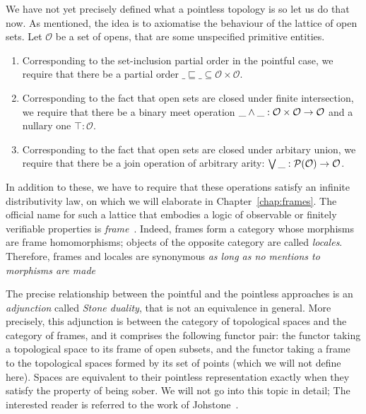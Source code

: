 We have not yet precisely defined what a pointless topology is so let us do that now. As
mentioned, the idea is to axiomatise the behaviour of the lattice of open sets. Let
$\mathcal{O}$ be a set of opens, that are some unspecified primitive entities.
\begin{enumerate}
  \item Corresponding to the set-inclusion partial order in the pointful case, we require
    that there be a partial order $\_\sqsubseteq\_ \subseteq \mathcal{O} \times \mathcal{O}$.
  \item Corresponding to the fact that open sets are closed under finite intersection, we
    require that there be a binary meet operation $\_ \wedge \_ : \mathcal{O} \times
    \mathcal{O} \rightarrow \mathcal{O}$ and a nullary one $\top : \mathcal{O}$.
  \item Corresponding to the fact that open sets are closed under arbitary union, we
    require that there be a join operation of arbitrary arity: $\bigvee{}\_ :
    \mathcal{P}(\mathcal{O}) \rightarrow \mathcal{O}$.
\end{enumerate}
In addition to these, we have to require that these operations satisfy an infinite
distributivity law, on which we will elaborate in Chapter~\ref{chap:frames}. The official
name for such a lattice that embodies a logic of observable or finitely verifiable
properties is \emph{frame}~\cite{vickers}. Indeed, frames form a category whose morphisms
are frame homomorphisms; objects of the opposite category are called \emph{locales}.
Therefore, frames and locales are synonymous
\emph{as long as no mentions to morphisms are made}~\cite{vickers, stone-spaces}

The precise relationship between the pointful and the pointless approaches is an
\emph{adjunction} called \emph{Stone duality}, that is not an equivalence in general. More
precisely, this adjunction is between the category of topological spaces and the category
of frames, and it comprises the following functor pair: the functor taking a topological
space to its frame of open subsets, and the functor taking a frame to the topological
spaces formed by its set of points (which we will not define here). Spaces are equivalent
to their pointless representation exactly when they satisfy the property of being sober.
We will not go into this topic in detail; The interested reader is referred to the work of
Johstone~\cite{johnstone-the-point, stone-spaces}.


